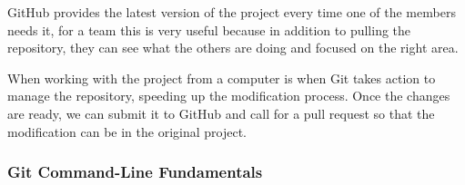 \documentclass{article}
\begin{document}
    GitHub provides the latest version of the project every time one of the members needs it, for a team this is very useful because in addition to pulling the repository, they can see what the others are doing and focused on the right area.\par
    
    When working with the project from a computer is when Git takes action to manage the repository, speeding up the modification process. Once the changes are ready, we can submit it to GitHub and call for a pull request so that the modification can be in the original project.
    
    \subsubsection{Git Command-Line Fundamentals}
    
\end{document}
